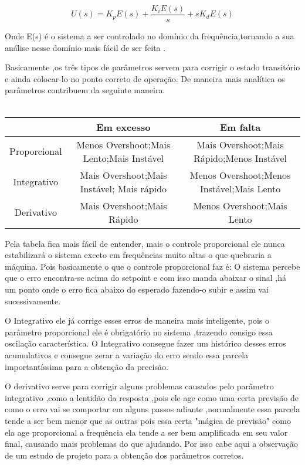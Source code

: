 \documentclass[11pt]{article}
\begin{document}
$$U(s)=K_p E(s) +\frac{K_iE(s)}{s}+sK_dE(s)$$  

Onde E(s) é o sistema a ser controlado no domínio da frequência,tornando a sua análise nesse domínio mais fácil de ser feita .

Basicamente ,os três tipos de parâmetros servem para corrigir o estado transitório e ainda colocar-lo no ponto correto de operação. De maneira mais analítica os parâmetros contribuem da seguinte maneira.\\\\
 \begin{center}
\begin{tabular}{|c|c|c|}
\hline
 & Em excesso & Em falta  \\
\hline
Proporcional &	Menos Overshoot;Mais Lento;Mais Instável & Mais Overshoot;Mais Rápido;Menos Instável	\\
\hline
Integrativo & Mais Overshoot;Mais Instável; Mais rápido & Menos Overshoot;Menos Instável;Mais Lento	\\
\hline
Derivativo & Mais Overshoot;Mais Rápido	& Menos Overshoot;Mais Lento	  \\
\hline 
\end{tabular}
\end{center}

Pela tabela fica mais fácil de entender, mais o controle proporcional ele nunca estabilizará o sistema exceto em frequências muito altas o que quebraria a máquina. Pois basicamente o que o controle proporcional faz é: O sistema percebe que o erro encontra-se acima do setpoint e com isso manda abaixar o sinal ,há um ponto onde o erro fica abaixo do esperado fazendo-o subir e assim vai sucessivamente. 

O Integrativo ele já corrige esses erros de maneira mais inteligente, pois o parâmetro proporcional ele é obrigatório no sistema ,trazendo consigo essa oscilação característica. O Integrativo consegue fazer um histórico desses erros acumulativos e consegue zerar a variação do erro sendo essa parcela importantíssima para a obtenção da precisão.

O derivativo serve para corrigir alguns problemas causados pelo parâmetro integrativo ,como a lentidão da resposta ,pois ele age como uma certa previsão de como o erro vai se comportar em alguns passos adiante ,normalmente essa parcela tende a ser bem menor que as outras pois essa certa "mágica de previsão" como ela age proporcional a frequência ela tende a ser bem amplificada em seu valor final, causando mais problemas do que ajudando. Por isso cabe aqui a observação de um estudo de projeto para a obtenção dos parâmetros corretos. 
\end{document}
